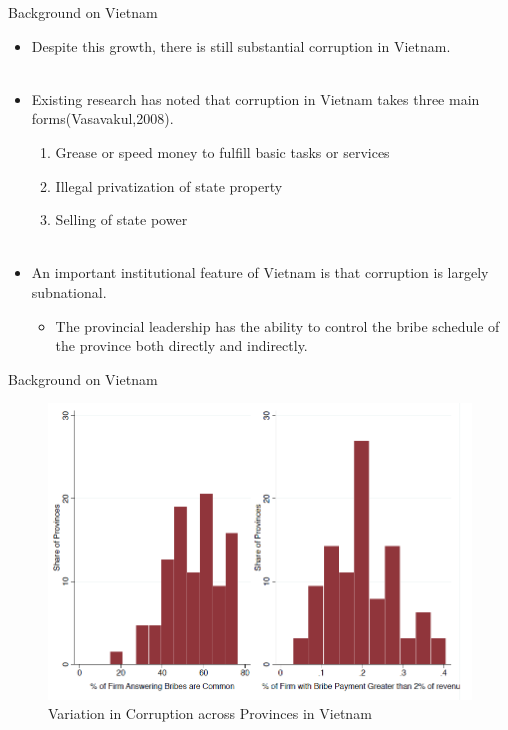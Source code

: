 \documentclass{beamer}
\begin{document}
\begin{frame}{Background on Vietnam}

\begin{itemize}
\item Despite this growth, there is still substantial corruption in Vietnam. \\~
\item Existing research has noted that corruption in Vietnam takes three main forms(Vasavakul,2008).
\begin{enumerate}
\item Grease or speed money to fulfill basic tasks or services
\item Illegal privatization of state property 
\item Selling of state power \\~
\end{enumerate}
\item An important institutional feature of Vietnam is that corruption is largely subnational.
\begin{itemize}
\item The provincial leadership has the ability to control the bribe schedule of the province both directly and indirectly.
\end{itemize}

\end{itemize}

\end{frame}

\begin{frame}{Background on Vietnam}

\begin{figure}
\centering
\includegraphics[width=0.8\linewidth]{4.png}
\caption{Variation in Corruption across Provinces in Vietnam}
\end{figure}

\end{frame}
\end{document}
